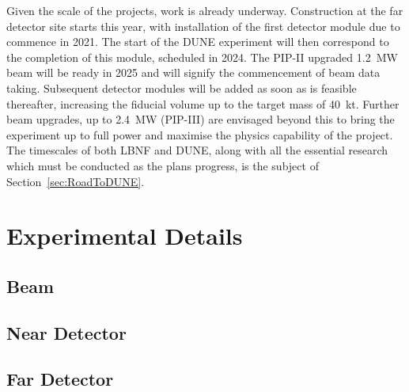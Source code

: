 Given the scale of the projects, work is already underway.  Construction at the far detector site starts this year, with installation of the first detector module due to commence in 2021.  The start of the DUNE experiment will then correspond to the completion of this module, scheduled in 2024.  The PIP-II upgraded 1.2~MW beam will be ready in 2025 and will signify the commencement of beam data taking.  Subsequent detector modules will be added as soon as is feasible thereafter, increasing the fiducial volume up to the target mass of 40~kt.  Further beam upgrades, up to 2.4~MW (PIP-III) are envisaged beyond this to bring the experiment up to full power and maximise the physics capability of the project.  The timescales of both LBNF and DUNE, along with all the essential research which must be conducted as the plans progress, is the subject of Section~\ref{sec:RoadToDUNE}.

\section{Experimental Details}\label{sec:DUNEExperiment}

\subsection{Beam}\label{sec:DUNEBeam}

\subsection{Near Detector}\label{sec:NearDetector}

\subsection{Far Detector}\label{sec:FarDetector}

